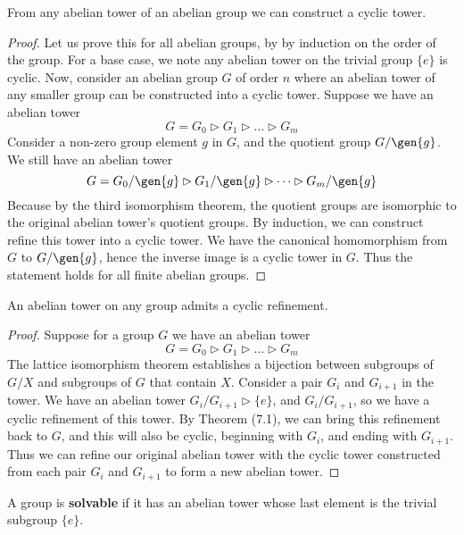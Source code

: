 \begin{theorem}
    From any abelian tower of an abelian group we can construct a cyclic tower.
\end{theorem}
\begin{proof}
    Let us prove this for all abelian groups, by by induction on the order of the group. For a base case, we note any abelian tower on the trivial group $\{e\}$ is cyclic. Now, consider an abelian group $G$ of order $n$ where an abelian tower of any smaller group can be constructed into a cyclic tower. Suppose we have an abelian tower
    \[ G = G_0 \rhd G_1 \rhd \dots \rhd G_m \]
    Consider a non-zero group element $g$ in $G$, and the quotient group $G/\gen{g}$. We still have an abelian tower
    \[ G = G_0/\gen{g} \rhd G_1/\gen{g} \rhd \dots \rhd G_m/\gen{g} \]
    Because by the third isomorphism theorem, the quotient groups are isomorphic to the original abelian tower's quotient groups. By induction, we can construct refine this tower into a cyclic tower. We have the canonical homomorphism from $G$ to $G/\gen{g}$, hence the inverse image is a cyclic tower in $G$. Thus the statement holds for all finite abelian groups.
\end{proof}

\begin{corollary}
    An abelian tower on any group admits a cyclic refinement.
\end{corollary}
\begin{proof}
    Suppose for a group $G$ we have an abelian tower
    \[ G = G_0 \rhd G_1 \rhd \dots \rhd G_m \]
    The lattice isomorphism theorem establishes a bijection between subgroups of $G/X$ and subgroups of $G$ that contain $X$. Consider a pair $G_i$ and $G_{i+1}$ in the tower. We have an abelian tower $G_i/G_{i+1} \rhd \{e\}$, and $G_i/G_{i+1}$, so we have a cyclic refinement of this tower. By Theorem (7.1), we can bring this refinement back to $G$, and this will also be cyclic, beginning with $G_i$, and ending with $G_{i+1}$. Thus we can refine our original abelian tower with the cyclic tower constructed from each pair $G_i$ and $G_{i+1}$ to form a new abelian tower.
\end{proof}

\begin{definition}
    A group is {\bf solvable}  if it has an abelian tower whose last element is the trivial subgroup $\{e\}$.
\end{definition}

